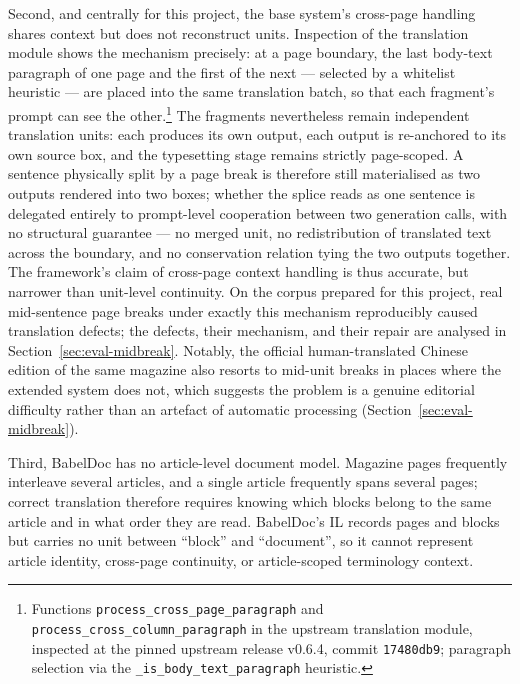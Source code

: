 Second, and centrally for this project, the base system's cross-page
handling shares context but does not reconstruct units. Inspection of
the translation module shows the mechanism precisely: at a page
boundary, the last body-text paragraph of one page and the first of
the next --- selected by a whitelist heuristic --- are placed into the
same translation batch, so that each fragment's prompt can see the
other.\footnote{Functions \texttt{process\_cross\_page\_paragraph} and
\texttt{process\_cross\_column\_paragraph} in the upstream translation
module, inspected at the pinned upstream release v0.6.4, commit
\texttt{17480db9}; paragraph selection via the
\texttt{\_is\_body\_text\_paragraph} heuristic.} The fragments
nevertheless remain independent translation
units: each produces its own output, each output is re-anchored to its
own source box, and the typesetting stage remains strictly
page-scoped. A sentence physically split by a page break is therefore
still materialised as two outputs rendered into two boxes; whether the
splice reads as one sentence is delegated entirely to prompt-level
cooperation between two generation calls, with no structural
guarantee --- no merged unit, no redistribution of translated text
across the boundary, and no conservation relation tying the two
outputs together. The framework's claim of cross-page context handling
\cite{qi2026babeldoc} is thus accurate, but narrower than unit-level
continuity. On the corpus prepared for this project, real mid-sentence
page breaks under exactly this mechanism reproducibly caused
translation defects; the defects, their mechanism, and their repair
are analysed in Section~\ref{sec:eval-midbreak}. Notably, the official
human-translated Chinese edition of the same magazine also resorts to
mid-unit breaks in places where the extended system does not, which
suggests the problem is a genuine editorial difficulty rather than an
artefact of automatic processing (Section~\ref{sec:eval-midbreak}).

Third, BabelDoc has no article-level document model. Magazine pages
frequently interleave several articles, and a single article frequently
spans several pages; correct translation therefore requires knowing
which blocks belong to the same article and in what order they are
read. BabelDoc's IL records pages and blocks but carries no unit
between ``block'' and ``document'', so it cannot represent article
identity, cross-page continuity, or article-scoped terminology
context.

